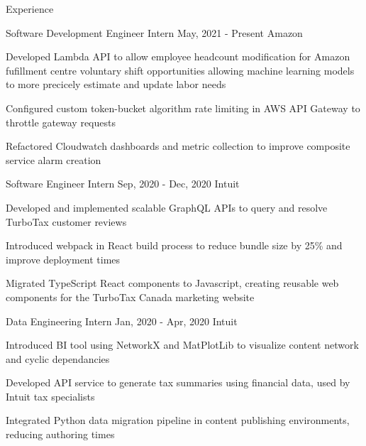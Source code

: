 \documentclass{resume} %
\begin{document}
	\vspace{-0.5em}
	\begin{rSection}{Experience}

		\begin{rWorkSection}
			{Software Development Engineer Intern }
			{May, 2021 - Present}
			{Amazon}
			{}
			{
				\item Developed Lambda API to allow employee headcount modification for Amazon fufillment centre voluntary 
				shift opportunities allowing machine learning models to more precicely estimate and update labor needs
				\item Configured custom token-bucket algorithm rate limiting in AWS API Gateway to throttle gateway requests
				\item Refactored Cloudwatch dashboards and metric collection to improve composite service alarm creation
			}
		\end{rWorkSection}
		
		\begin{rWorkSection}
			{Software Engineer Intern}
			{Sep, 2020 - Dec, 2020}
			{Intuit}
			{}
			{
				\item Developed and implemented scalable GraphQL APIs to query and resolve TurboTax customer reviews
				\item Introduced webpack in React build process to reduce bundle size by 25{\%} and improve deployment times
				\item Migrated TypeScript React components to Javascript, creating reusable web components for the TurboTax
				Canada marketing website
			}
		\end{rWorkSection}

		\begin{rWorkSection}
			{Data Engineering Intern}
			{Jan, 2020 - Apr, 2020}
			{Intuit}
			{}
			{
				\item Introduced BI tool using NetworkX and MatPlotLib to visualize content network and cyclic dependancies
				\item Developed API service to generate tax summaries using financial data, used by Intuit tax specialists
				\item Integrated Python data migration pipeline in content publishing environments, reducing authoring times
			}
		\end{rWorkSection}


\end{rSection}
\end{document}
